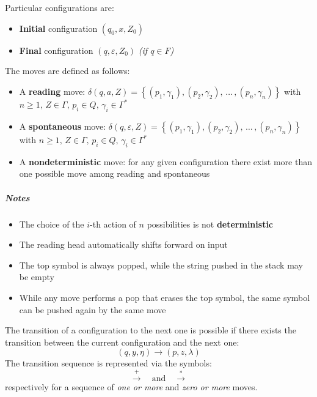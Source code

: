 \documentclass[english]{article}
\begin{document}
Particular configurations are:

\begin{itemize}
  \item \textbf{Initial} configuration \(\left( q_0, x, Z_0 \right)\)
  \item \textbf{Final} configuration \(\left( q, \varepsilon, Z_0 \right)\) \textit{(if \(q \in F\))}
\end{itemize}

\begin{definition}
  The moves are defined as follows:
  \begin{itemize}
    \item A \textbf{reading} move: \(\delta(q, a, Z) = \left\{ (p_1, \gamma_1), (p_2, \gamma_2), \,\ldots\, , (p_n, \gamma_n) \right\}\) with \(n \geq 1, \, Z \in \Gamma, \, p_i \in Q, \, \gamma_i \in \Gamma^\ast\)
    \item A \textbf{spontaneous} move: \(\delta(q, \varepsilon, Z) = \left\{ (p_1, \gamma_1), (p_2, \gamma_2), \,\ldots\, , (p_n, \gamma_n) \right\}\) with \(n \geq 1, \, Z \in \Gamma, \, p_i \in Q, \, \gamma_i \in \Gamma^\ast\)
    \item A \textbf{nondeterministic} move: for any given configuration there exist more than one possible move among reading and spontaneous
  \end{itemize}
\end{definition}

\subparagraph*{Notes}

\begin{itemize}
  \item The choice of the \(i\)-th action of \(n\) possibilities is not \textbf{deterministic}
  \item The reading head automatically shifts forward on input
  \item The top symbol is always popped, while the string pushed in the stack may be empty
  \item While any move performs a pop that erases the top symbol, the same symbol can be pushed again by the same move
\end{itemize}

\bigskip
The transition of a configuration to the next one is possible if there exists the transition between the current configuration and the next one:
\[ \left( q, y, \eta \right) \rightarrow \left( p, z, \lambda \right) \]
The transition sequence is represented via the symbols:
\[ \xrightarrow{+} \quad \text{and} \quad \xrightarrow{\ast} \]
respectively for a sequence of \textit{one or more} and \textit{zero or more} moves.
\end{document}
